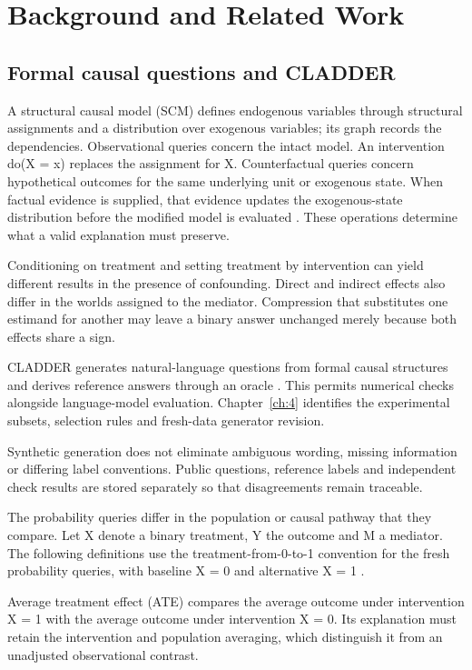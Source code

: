 \chapter{Background and Related Work}\label{ch:2}

\section{Formal causal questions and CLADDER}\label{sec:2.1}

A structural causal model (SCM) defines endogenous variables through structural assignments and a distribution over exogenous variables; its graph records the dependencies. Observational queries concern the intact model. An intervention do(X = x) replaces the assignment for X. Counterfactual queries concern hypothetical outcomes for the same underlying unit or exogenous state. When factual evidence is supplied, that evidence updates the exogenous-state distribution before the modified model is evaluated \cite{Pearl_2009}. These operations determine what a valid explanation must preserve.

Conditioning on treatment and setting treatment by intervention can yield different results in the presence of confounding. Direct and indirect effects also differ in the worlds assigned to the mediator. Compression that substitutes one estimand for another may leave a binary answer unchanged merely because both effects share a sign.

CLADDER generates natural-language questions from formal causal structures and derives reference answers through an oracle \cite{NEURIPS2023_631bb943}. This permits numerical checks alongside language-model evaluation. Chapter~\ref{ch:4} identifies the experimental subsets, selection rules and fresh-data generator revision.

Synthetic generation does not eliminate ambiguous wording, missing information or differing label conventions. Public questions, reference labels and independent check results are stored separately so that disagreements remain traceable.

The probability queries differ in the population or causal pathway that they compare. Let X denote a binary treatment, Y the outcome and M a mediator. The following definitions use the treatment-from-0-to-1 convention for the fresh probability queries, with baseline X = 0 and alternative X = 1 \cite{Pearl_2009,NEURIPS2023_631bb943}.

Average treatment effect (ATE) compares the average outcome under intervention X = 1 with the average outcome under intervention X = 0. Its explanation must retain the intervention and population averaging, which distinguish it from an unadjusted observational contrast.

